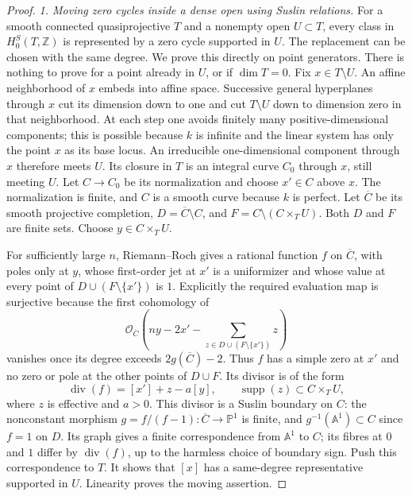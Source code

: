 \documentclass[11pt,a4paper]{article}
\theoremstyle{definition}\newtheorem{definition}[theorem]{Definition}
\theoremstyle{remark}\newtheorem{remark}[theorem]{Remark}
\begin{document}
\begin{proof}
\emph{1. Moving zero cycles inside a dense open using Suslin relations.}
For a smooth connected quasiprojective $T$ and a nonempty
open $U\subset T$, every class in $H^S_0(T,\mathbb Z)$
is represented by a zero cycle supported in $U$.
The replacement can be chosen with the same degree.
We prove this directly on point generators.
There is nothing to prove for a point already in $U$,
or if $\dim T=0$.
Fix $x\in T\setminus U$.  An affine neighborhood of $x$
embeds into affine space.  Successive general hyperplanes
through $x$ cut its dimension down to one and cut
$T\setminus U$ down to dimension zero in that neighborhood.
At each step one avoids finitely many positive-dimensional
components; this is possible because $k$ is infinite and
the linear system has only the point $x$ as its base locus.
An irreducible one-dimensional component through $x$
therefore meets $U$.  Its closure in $T$ is an integral
curve $C_0$ through $x$, still meeting $U$.
Let $C\to C_0$ be its normalization and choose
$x'\in C$ above $x$.  The normalization is finite,
and $C$ is a smooth curve because $k$ is perfect.
Let $\overline C$ be its smooth projective completion,
$D=\overline C\setminus C$, and
$F=C\setminus(C\times_T U)$.
Both $D$ and $F$ are finite sets.  Choose
$y\in C\times_T U$.

For sufficiently large $n$, Riemann--Roch gives a rational
function $f$ on $\overline C$, with poles only at $y$,
whose first-order jet at $x'$ is a uniformizer and whose
value at every point of $D\cup(F\setminus\{x'\})$
is $1$.  Explicitly the required evaluation map is
surjective because the first cohomology of
\[
 \mathcal O_{\overline C}
 \left(ny-2x'-\sum_{z\in D\cup(F\setminus\{x'\})}z\right)
\]
vanishes once its degree exceeds $2g(\overline C)-2$.
Thus $f$ has a simple zero at $x'$ and no zero or pole
at the other points of $D\cup F$.
Its divisor is of the form
\[
 \operatorname{div}(f)=[x']+z-a[y],
 \qquad \operatorname{supp}(z)\subset C\times_T U,
\]
where $z$ is effective and $a>0$.
This divisor is a Suslin boundary on $C$:
the nonconstant morphism
$g=f/(f-1):\overline C\to\mathbb P^1$ is finite,
and $g^{-1}(\mathbb A^1)\subset C$ since $f=1$ on $D$.
Its graph gives a finite correspondence from
$\mathbb A^1$ to $C$; its fibres at $0$ and $1$
differ by $\operatorname{div}(f)$, up to the harmless
choice of boundary sign.  Push this correspondence to
$T$.  It shows that $[x]$ has a same-degree representative
supported in $U$.  Linearity proves the moving assertion.


\end{proof}
\end{document}

